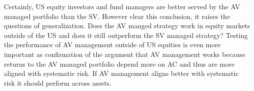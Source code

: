 Certainly, US equity investors and fund managers are better served by the AV managed portfolio than the SV. However clear this conclusion, it raises the questions of generalization. Does the AV manged strategy work in equity markets outside of the US and does it still outperform the SV managed strategy? Testing the performance of AV management outside of US equities is even more important as confirmation of the argument that AV management works because returns to the AV managed portfolio depend more on AC and thus are more aligned with systematic risk. If AV management aligns better with systematic risk it should perform across assets.